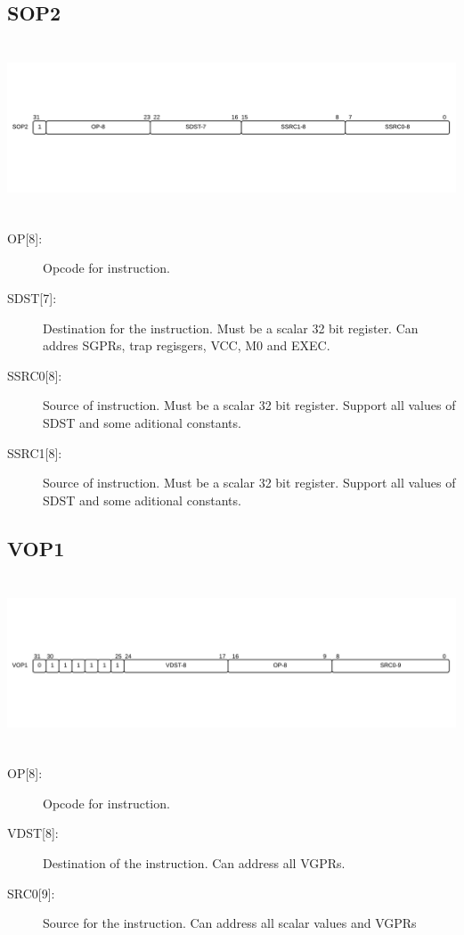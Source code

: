 \documentclass{article}
\begin{document}
\subsection{SOP2}
\includegraphics[width=7in, height=2in]{sop2.png} \\
\begin{description}
  \item [{OP[8]:}] Opcode for instruction.
  \item [{SDST[7]:}] Destination for the instruction. Must be a scalar 32 bit register. Can addres SGPRs, trap regisgers, VCC, M0 and EXEC.
  \item [{SSRC0[8]:}] Source of instruction. Must be a scalar 32 bit register. Support all values of SDST and some aditional constants.
  \item [{SSRC1[8]:}] Source of instruction. Must be a scalar 32 bit register. Support all values of SDST and some aditional constants.
\end{description}

\subsection{VOP1}
\includegraphics[width=7in, height=2in]{vop1.png} \\
\begin{description}
  \item [{OP[8]:}] Opcode for instruction.
  \item [{VDST[8]:}] Destination of the instruction. Can address all VGPRs.
  \item [{SRC0[9]:}] Source for the instruction. Can address all scalar values and VGPRs
\end{description}
\end{document}
